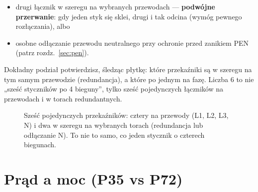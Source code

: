 \documentclass[11pt]{article}
\begin{document}
\begin{itemize}
 \item drugi łącznik w szeregu na wybranych przewodach --- \textbf{podwójne przerwanie}: gdy jeden styk się sklei, drugi i tak odcina (wymóg pewnego rozłączania), albo
 \item osobne odłączanie przewodu neutralnego przy ochronie przed zanikiem PEN (patrz rozdz.~\ref{sec:pen}).
\end{itemize}

Dokładny podział potwierdzisz, śledząc płytkę: które przekaźniki są w szeregu na tym samym przewodzie (redundancja), a które po jednym na fazę. Liczba 6 to nie „sześć styczników po 4 bieguny'', tylko sześć pojedynczych łączników na przewodach i w torach redundantnych.

\begin{figure}[h]\centering
{}
\caption{Sześć pojedynczych przekaźników: cztery na przewody (L1, L2, L3, N) i dwa w szeregu na wybranych torach (redundancja lub odłączanie N). To nie to samo, co jeden stycznik o czterech biegunach.}
\label{fig:rel}
\end{figure}

\section{Prąd a moc (P35 vs P72)}
\end{document}
